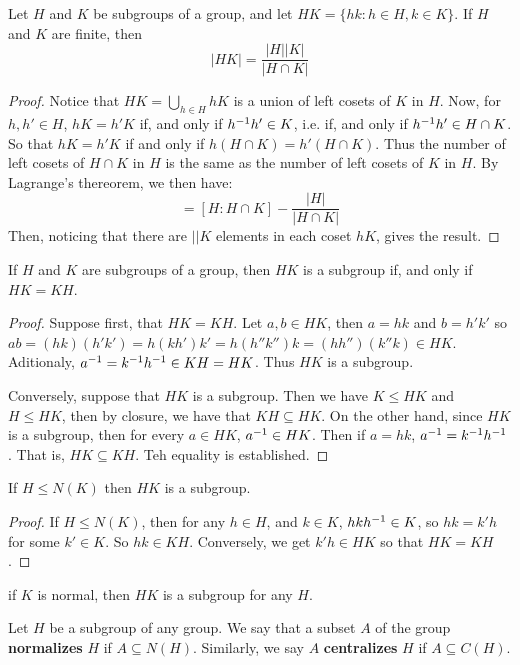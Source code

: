 \begin{theorem}\label{proposition_3.3.6}
  Let $H$ and  $K$ be subgroups of a group, and let  $HK=\{hk : h \in H, k \in
  K\}$. If $H$ and $K$ are finite, then
  \begin{equation}
    |HK|=\frac{|H||K|}{|H \cap K|}
  \end{equation}
\end{theorem}
\begin{proof}
  Notice that $HK=\bigcup_{h \in H}{hK}$ is a union of left cosets of $K$ in
  $H$. Now, for  $h,h' \in H$,  $hK=h'K$ if, and only if  $h^{-1}h' \in K$,
  i.e. if, and only if $h^{-1}h' \in H \cap K$. So that $hK=h'K$ if and only
  if  $h(H \cap K)=h'(H \cap K)$. Thus the number of left cosets of $H \cap K$
  in $H$ is the same as the number of left cosets of  $K$ in  $H$. By
  Lagrange's thereorem, we then have:
  \begin{equation*}
    [ H : K ]=[ H : H \cap K ]-\frac{|H|}{|H \cap K|}
  \end{equation*}
  Then, noticing that there are $||K$ elements in each coset $hK$, gives
  the result.
\end{proof}

\begin{proposition}\label{proposition_3.3.7}
  If $H$ and $K$ are subgroups of a group, then $HK$ is a subgroup if, and
  only if  $HK=KH$.
\end{proposition}
\begin{proof}
  Suppose first, that $HK=KH$. Let $a,b \in HK$, then $a=hk$ and  $b=h'k'$ so
  $ab=(hk)(h'k')=h(kh')k'=h(h''k'')k=(hh'')(k''k) \in HK$. Aditionaly,
  $a^{-1}=k^{-1}h^{-1} \in KH=HK$. Thus $HK$ is a subgroup.

  Conversely, suppose that  $HK$ is a subgroup. Then we have  $K \leq HK$ and
  $H \leq HK$, then by closure, we have that  $KH \subseteq HK$. On the
  other hand, since  $HK$ is a subgroup, then for every  $a \in HK$,
  $a^{-1} \in HK$. Then if $a=hk$,  $a^{-1}=k^{-1}h^{-1}$. That is, $HK
  \subseteq KH$. Teh equality is established.
\end{proof}
\begin{corollary}
  If $H \leq N(K)$ then $HK$ is a subgroup.
\end{corollary}
\begin{proof}
  If $H \leq N(K)$, then for any $h \in H$, and  $k \in K$,  $hkh^{-1} \in
  K$, so $hk=k'h$ for some  $k' \in K$. So  $hk \in KH$. Conversely, we get
  $k'h \in HK$ so that  $HK=KH$.
\end{proof}
\begin{corollary}
  if $K$ is normal, then $HK$ is a subgroup for any $H$.
\end{corollary}

\begin{definition}
  Let $H$ be a subgroup of any group. We say that a subset $A$ of the group
  \textbf{normalizes} $H$ if  $A \subseteq N(H)$. Similarly, we say $A$
  \textbf{centralizes} $H$ if  $A \subseteq C(H)$.
\end{definition}
